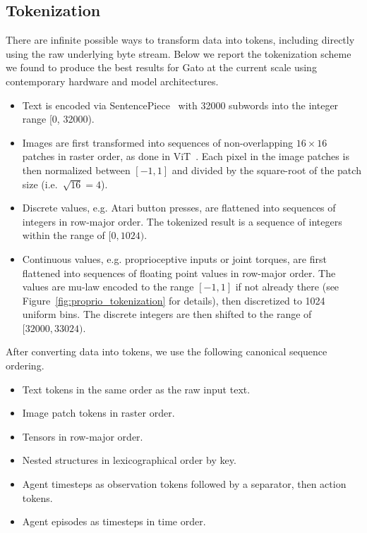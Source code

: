 \documentclass[10pt]{article} \usepackage[accepted]{tmlr}
\newcommand{\model}{{Gato}}
\begin{document}
\subsection{Tokenization}\label{sec:tokenization}
\vskip 0.2cm
There are infinite possible ways to transform data into tokens, including directly using the raw underlying byte stream.
Below we report the tokenization scheme we found to produce the best results for \model{} at the current scale using contemporary hardware and model architectures.
\begin{itemize}
    \item Text is encoded via SentencePiece~\citep{kudo-richardson-2018-sentencepiece} with 32000 subwords into the integer range [0, 32000).
    \item Images are first transformed into sequences of non-overlapping $16\times 16$ patches in raster order, as done in ViT~\citep{dosovitskiy2020image}. Each pixel in the image patches is then normalized between $[-1, 1]$ and divided by the square-root of the patch size (i.e.\ $\sqrt{16} = 4$).
    \item Discrete values, e.g. Atari button presses, are flattened into sequences of integers in row-major order. The tokenized result is a sequence of integers within the range of $[0, 1024)$.
    \item Continuous values, e.g. proprioceptive inputs or joint torques, are first flattened into sequences of floating point values in row-major order. The values are mu-law encoded to the range  $[-1, 1]$ if not already there (see Figure~\ref{fig:proprio_tokenization} for details), then discretized to 1024 uniform bins. The discrete integers are then shifted to the range of $[32000, 33024)$. 
\end{itemize}

\noindent After converting data into tokens, we use the following canonical sequence ordering.
\begin{itemize}
    \item Text tokens in the same order as the raw input text.
    \item Image patch tokens in raster order.
    \item Tensors in row-major order.
    \item Nested structures in lexicographical order by key.
    \item Agent timesteps as observation tokens followed by a separator, then action tokens.
    \item Agent episodes as timesteps in time order.
\end{itemize}
\end{document}
